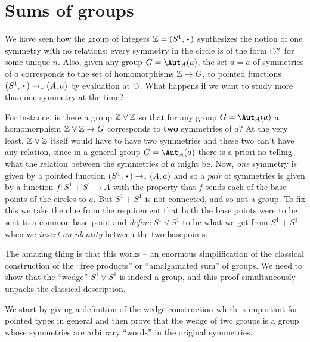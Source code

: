\section{Sums of groups}
\label{sec:coprod}
We have seen how the group of integers $\ZZ=(S^1,\base)$ synthesizes the notion of one symmetry with no relations: every symmetry in the circle is of the form $\circlearrowleft^n$ for some unique $n$.  Also, given any group $G=\aut_A(a)$, the set $a=a$ of symmetries of $a$ corresponds to the set of homomorphisms $\mathbb{Z}\to G$, \ie to pointed functions $(S^1,\base)\to_*(A,a)$ by evaluation at $\circlearrowleft$.  What happens if we want to study more than one symmetry at the time?

For instance, is there a group $\mathbb{Z}\vee\mathbb{Z}$ so that for any group $G=\aut_A(a)$ a homomorphism $\mathbb{Z}\vee\mathbb{Z}\to G$ corresponds to {\bf two} symmetries of $a$?
At the very least, $\mathbb{Z}\vee\mathbb{Z}$ itself would have to have two symmetries and these two can't have any relation, since in a general group $G=\aut_A(a)$ there is a priori no telling what the relation between the symmetries of $a$ might be.
Now, \emph{one} symmetry is given by a pointed function $(S^1,\base)\to_*(A,a)$ and so a \emph{pair} of symmetries is given by a function $f:S^1+S^1\to A$ with the property that $f$ sends each of the base points of the circles to $a$.  But $S^1+S^1$ is not connected, and so not a group.  To fix this we take the clue from the requirement that both the base points were to be sent to a common base point and \emph{define} $S^1\vee S^1$ to be what we get from $S^1+S^1$ when we \emph{insert an identity} between the two basepoints.

The amazing thing is that this works -- an enormous simplification of the classical construction of the ``free products'' or ``amalgamated sum'' of groups.  We need to show that the ``wedge'' $S^1\vee S^1$ is indeed a group, and this proof simultaneously unpacks the classical description.

We start by giving a definition of the wedge construction which is important for pointed types in general and then prove that the wedge of two groups is a group whose symmetries are arbitrary ``words'' in the original symmetries.

